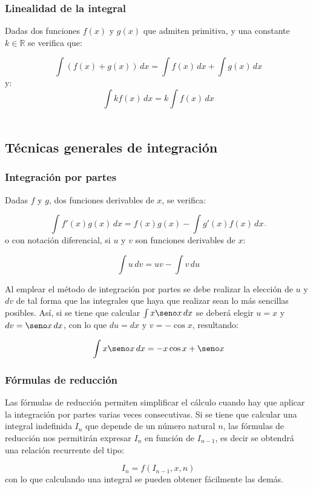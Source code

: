 \subsubsection*{Linealidad de la integral}

Dadas dos funciones $f(x)$ y $g(x)$ que admiten primitiva, y una
constante $k \in \mathbb{R}$ se verifica que:

\[
\ \int{(f(x)+g(x))}\,dx=\int{f(x)}\,dx+\int{g(x)}\,dx
\]
y:
\[
\ \int{kf(x)}\,dx=k\int{f(x)}\,dx
\]\\


\subsection*{Técnicas generales de integración}

\subsubsection*{Integración por partes}

Dadas $f$ y $g$, dos funciones derivables de $x$, se verifica:

\[
\ \int{f'(x)g(x)}\,dx=f(x)g(x)-\int{g'(x)f(x)}\,dx\overline{}
\]
o con notación diferencial, si $u$ y $v$ son funciones derivables de
$x$:

\[
\ \int{u}\,dv=uv-\int{v}\,du
\]


Al emplear el método de integración por partes se debe realizar la
elección de $u$ y $dv$ de tal forma que las integrales que haya que
realizar sean lo más sencillas posibles. Así, si se tiene que
calcular $\int{x \seno x}\,dx$ se deberá elegir $u=x$ y $dv=\seno x\,
dx$, con lo que $du=dx$ y $v=-\cos x$, resultando:

\[
\ \int{x \seno x}\,dx=-x\cos x+\seno x
\]

\subsubsection*{Fórmulas de reducción}

Las fórmulas de reducción permiten simplificar el cálculo cuando hay
que aplicar la integración por partes varias veces consecutivas. Si
se tiene que calcular una integral indefinida $I_{n}$ que depende de
un número natural $n$, las fórmulas de reducción nos permitirán
expresar $I_{n}$ en función de $I_{n-1}$, es decir se obtendrá una
relación recurrente del tipo:

\[
\ I_{n}=f(I_{n-1},x,n)
\]
con lo que calculando una integral se pueden obtener fácilmente las
demás.

